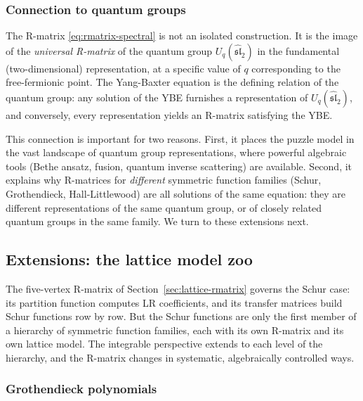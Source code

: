 \subsubsection*{Connection to quantum groups}

The R-matrix \eqref{eq:rmatrix-spectral} is not an isolated
construction.  It is the image of the \emph{universal R-matrix} of
the quantum group $U_q(\widehat{\mathfrak{sl}}_2)$ in the fundamental
(two-dimensional) representation, at a specific value of $q$
corresponding to the free-fermionic point.  The Yang-Baxter equation
is the defining relation of the quantum group: any solution of the
YBE furnishes a representation of $U_q(\widehat{\mathfrak{sl}}_2)$,
and conversely, every representation yields an R-matrix satisfying the
YBE.

This connection is important for two reasons.  First, it places the
puzzle model in the vast landscape of quantum group representations,
where powerful algebraic tools (Bethe ansatz, fusion, quantum inverse
scattering) are available.  Second, it explains why R-matrices for
\emph{different} symmetric function families (Schur, Grothendieck,
Hall-Littlewood) are all solutions of the same equation: they are
different representations of the same quantum group, or of closely
related quantum groups in the same family.  We turn to these
extensions next.


\subsection{Extensions: the lattice model zoo}
\label{sec:lattice-extensions}

The five-vertex R-matrix of Section~\ref{sec:lattice-rmatrix}
governs the Schur case: its partition function computes LR
coefficients, and its transfer matrices build Schur functions row by
row.  But the Schur functions are only the first member of a
hierarchy of symmetric function families, each with its own
R-matrix and its own lattice model.  The integrable perspective
extends to each level of the hierarchy, and the R-matrix changes
in systematic, algebraically controlled ways.

\subsubsection*{Grothendieck polynomials}

